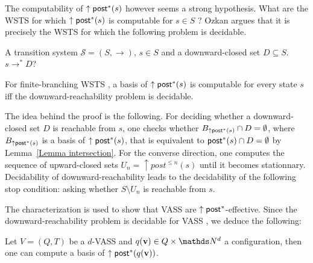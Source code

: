 The computability of $\uparrow \textsf{post}^*(s)$ however seems a strong hypothesis. What are the WSTS for which $\uparrow \textsf{post}^*(s)$ is computable for $s \in S$ ?
Ozkan \cite{DBLP:conf/gg/Ozkan22} argues that it is precisely the WSTS for which the following problem is decidable.

{A transition system $\mathscr{S}=(S,\rightarrow)$, $s \in S$ and a downward-closed set $D
\subseteq S$.}
{$s  \to^* D$? \newline}

\begin{proposition}\label{post*}
For finite-branching WSTS%
, a basis of $\uparrow \textsf{post}^*(s)$ is computable for every state $s$ iff the downward-reachability problem is decidable.
\end{proposition}

The idea behind the proof is the following. For deciding whether a downward-closed set $D$ is reachable from $s$, one checks whether
$B_{\uparrow \textsf{post}^*(s)} \cap D = \emptyset$, 
where $B_{\uparrow \textsf{post}^*(s)}$ is a basis of $\uparrow \textsf{post}^*(s)$,
 that is equivalent to $\textsf{post}^*(s)\cap D = \emptyset$ by
Lemma~\ref{Lemma intersection}. For the converse direction, one computes the sequence of upward-closed sets
$U_n = \uparrow post^{\leq n}(s)$ until it becomes stationnary. 
Decidability of downward-reachability leads to the decidability of the following stop condition:
asking whether $S \setminus U_n$ is reachable from $s$.


The characterization is used to show that VASS are $\uparrow \textsf{post}^*$-effective. Since the downward-reachability problem is decidable for VASS , we  deduce the following:

\begin{proposition}
Let $V= (Q,T)$ be a $d$-VASS and $q(\textbf{v}) \in Q \times \N^d$ a configuration, then one can compute a basis of $\uparrow \textsf{post}^*(q(\textbf{v}))$.
\end{proposition}

